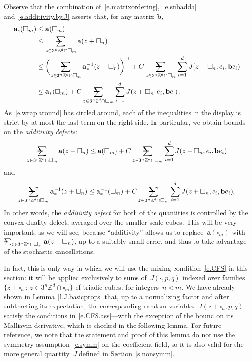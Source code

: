 \documentclass[11pt]{article} %
\makeatletter
\let\oldsquare\square %
\renewcommand{\square}{\oldsquare}
\numberwithin{equation}{section}
\theoremstyle{definition}
\newcommand*{\Zd}{\ensuremath{\mathbb{Z}^d}}
\renewcommand{\b}{\ensuremath{\mathbf{b}}}
\renewcommand{\a}{\mathbf{a}}
\newcommand{\cu}{\square}
\newcommand{\avsum}{\mathop{\mathpalette\avsuminner\relax}\displaylimits}
\newcommand\avsuminner[2]{%
  {\sbox0{$\m@th#1\sum$}%
   \vphantom{\usebox0}%
   \ooalign{%
     \hidewidth
     \smash{\,\rule[.23em]{8.8pt}{1.1pt} \relax}%
     \hidewidth\cr
     $\m@th#1\sum$\cr
   }%
  }%
}
\newcommand{\avsumtext}{\mathop{\mathpalette\avsuminnerr\relax}\displaylimits}
\newcommand\avsuminnerr[2]{%
  {\sbox0{$\m@th#1\sum$}%
   \vphantom{\usebox0}%
   \ooalign{%
     \hidewidth
     \smash{\,\rule[.23em]{6pt}{0.7pt} \relax}%
     \hidewidth\cr
     $\m@th#1\sum$\cr
   }%
  }%
}
\makeatother
\begin{document}
\smallskip

Observe that the combination of~\eqref{e.matrixordering},~\eqref{e.subadda} and~\eqref{e.additivity.by.J} asserts that, for any matrix~$\b$, 
\begin{align}
\label{e.wrap.around}
\a_*(\cu_m) 
& 
\leq 
\a(\cu_m) 
\notag \\ & 
\leq 
\avsum_{z\in 3^n\Zd \cap \cu_m} 
\a(z+\cu_n) 
\notag \\ & 
\leq 
\biggl(
\avsum_{z\in 3^n\Zd \cap \cu_m} 
\a_*^{-1}(z+\cu_n) 
\biggr)^{\!\!-1}
+ C \avsum_{z\in 3^n\Zd\cap \cu_m}
\sum_{i=1}^d 
J(z+\cu_n,e_i,\b e_i)
\notag \\ & 
\leq 
\a_*(\cu_m) + C \avsum_{z\in 3^n\Zd\cap \cu_m}
\sum_{i=1}^d 
J(z+\cu_n,e_i,\b e_i)
\,.
\end{align}
As~\eqref{e.wrap.around} has circled around, each of the inequalities in the display is strict by at most the last term on the right side. In particular, we obtain bounds on the \emph{additivity defects}:
\begin{equation}
\label{e.add.defect.a}
\avsum_{z\in 3^n\Zd \cap \cu_m} 
\a(z+\cu_n) 
\leq 
\a(\cu_m) + C \avsum_{z\in 3^n\Zd\cap \cu_m}
\sum_{i=1}^d 
J(z+\cu_n,e_i,\b e_i)
\end{equation}
and
\begin{equation}
\label{e.add.defect.astar}
\avsum_{z\in 3^n\Zd \cap \cu_m} 
\a_*^{-1}(z+\cu_n) 
\leq 
\a_*^{-1} (\cu_m) + C \avsum_{z\in 3^n\Zd\cap \cu_m}
\sum_{i=1}^d 
J(z+\cu_n,e_i,\b e_i).
\end{equation}
In other words, the \emph{additivity defect} for both of the quantities is controlled by the convex duality defect, averaged over the smaller scale cubes. This will be very important, as we will see, because ``additivity'' allows us to replace~$\a(\cu_m)$ with~$\avsumtext_{z\in 3^n\Zd \cap \cu_m} 
\a(z+\cu_n)$, up to a suitably small error, and thus to take advantage of the stochastic cancellations. 

\smallskip

In fact, this is only way in which we will use the mixing condition~\eqref{e.CFS} in this section: it will be applied exclusively to sums of~$J(\cdot,p,q)$ indexed over families~$\{ z+\cu_n\,:\, z\in 3^n\Zd\cap \cu_m \}$ of triadic cubes, for integers~$n<m$. We have already shown in Lemma~\ref{l.J.basicprops} that, up to a normalizing factor and after subtracting its expectation, the corresponding random variables~$J(z+\cu_n,p,q)$ satisfy the conditions in~\eqref{e.CFS.ass}---with the exception of the bound on its Malliavin derivative, which is checked in the following lemma.
For future reference, we note that the statement and proof of this lemma do not use the symmetry assumption~\eqref{e.symm} on the coefficient field, so it is also valid for the more general quantity~$J$ defined in Section~\ref{s.nonsymm}. 
\end{document}
